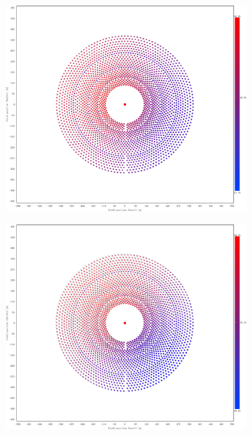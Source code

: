 \documentclass[withoutpreface,bwprint]{cumcmthesis} %
\begin{document}
\begin{enumerate}[label=$Step$ \arabic*:, leftmargin=*]
\begin{figure}[htbp]
\begin{subfigure}[b]{.49\textwidth}
\end{subfigure}
\begin{subfigure}[b]{.49\textwidth}
\includegraphics[width=\textwidth,height=.82\textwidth]{figures/2682夏至.png}%
\end{subfigure}
\begin{subfigure}[b]{.49\textwidth}
\includegraphics[width=\textwidth]{figures/2682秋分.png}
\end{subfigure}
\begin{subfigure}[b]{.49\textwidth}

\end{subfigure}
\end{figure}
\end{enumerate}
\end{document}
